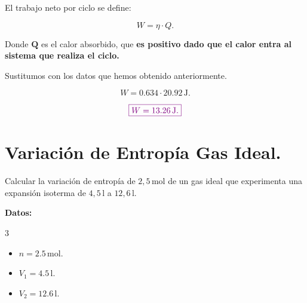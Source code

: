 \documentclass[a4paper,12pt]{article} %
\begin{document}
\begin{justify}
    El trabajo neto por ciclo se define:
\end{justify}

\[ W = \eta \cdot Q. \]

\vspace{\baselineskip}

\begin{justify}
    Donde \(\mathbf{Q}\) es el calor absorbido, que \textbf{es positivo dado que el calor entra al sistema que realiza el ciclo.}
\end{justify}

\begin{justify}
    Sustitumos con los datos que hemos obtenido anteriormente.
\end{justify}

\[ W = 0.634 \cdot 20.92 \, \mathrm{J}. \]

\vspace{\baselineskip}

\[\textcolor{violet}{\boxed{ W = 13.26 \, \mathrm{J}. }}\]

\vspace{\baselineskip}

\section{Variación de Entropía Gas Ideal.}

\begin{justify}
    Calcular la variación de entropía de \(2,5 \, \mathrm{mol}\) de un gas ideal que experimenta una expansión isoterma de \(4,5 \, \mathrm{l}\) a \(12,6 \, \mathrm{l}\).
\end{justify}

\begin{justify}
    \textbf{Datos:}
\end{justify}

\begin{multicols}{3}
    \begin{itemize}
        \item \( n = 2.5 \, \mathrm{mol}. \)
        \item \( V_1 = 4.5 \, \mathrm{l}. \)
        \item \( V_2 = 12.6 \, \mathrm{l}. \)
    \end{itemize}
\end{multicols}

\vspace{\baselineskip}
\end{document}
